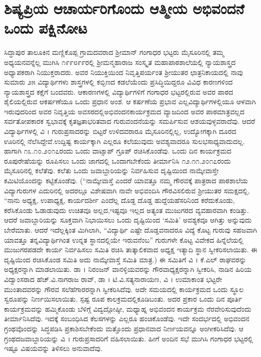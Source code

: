 {\fontsize{14}{16}\selectfont

\chapter{ಶಿಷ್ಯಪ್ರಿಯ ಆಚಾರ್ಯರಿಗೊಂದು ಆತ್ಮೀಯ ಅಭಿವಂದನೆ \eng{--} ಒಂದು ಪಕ್ಷಿನೋಟ}

ಸಿದ್ಧಾಪುರ ತಾಲೂಕಿನ ಮಣ್ಣಿಕೊಪ್ಪ ಗ್ರಾಮದವರಾದ ಶ್ರೀಮಾನ್ ಗಂಗಾಧರ ಭಟ್ಟರು ಮೈಸೂರಿನಲ್ಲಿ ತಮ್ಮ ಅಧ್ಯಯನವನ್ನೆಲ್ಲ ಮುಗಿಸಿ ೧೯೯೮\enginline{-}೯೯ರಲ್ಲಿ ಶ್ರೀಮನ್ಮಹಾರಾಜ ಸಂಸ್ಕೃತ ಮಹಾಪಾಠಶಾಲೆಯಲ್ಲಿ ನ್ಯಾಯಶಾಸ್ತ್ರದ ಅಧ್ಯಾಪಕರಾಗಿ \hbox{ನಿಯುಕ್ತರಾದರು}. ಅವರ ನಿಯುಕ್ತಿಯಿಂದ ನಿವೃತ್ತಿಪರ್ಯಂತ ಶ್ರೀಯುತರ ಛಾತ್ರನಿಕಾಯದಲ್ಲಿ ನಾವು ಸುಮಾರು ೨೫ ವಿದ್ಯಾರ್ಥಿಗಳು \enginline{-} ಶಾಸ್ತ್ರಗಳಲ್ಲಿ ಕಬ್ಬಿಣದ ಕಡಲೆಯೆಂದು ಪ್ರಸಿದ್ಧಿ\-ಯಿದ್ದರೂ ವಿವಿಧ ಕಾರಣಗಳಿಂದ ನ್ಯಾಯಶಾಸ್ತ್ರದ ಕಕ್ಷೆಗೆ ಬಂದವರು. ಆ\break ಕಾರಣಗಳಲ್ಲಿ ವಿದ್ಯಾರ್ಥಿಗಳಿಗೆ ಗಂಗಾಧರ ಭಟ್ಟರಲ್ಲಿರುವ ಅವರ ಪಾಠದ ಶೈಲಿಯಲ್ಲಿರುವ ಆಕರ್ಷಣೆಯೂ ಒಂದು ಪ್ರಧಾನ ಅಂಶ. ಆ ಕರ್ಷಣೆಯ ಪ್ರಭಾವ ಎಲ್ಲ\break ವಿದ್ಯಾರ್ಥಿಗಳಲ್ಲಿಯೂ ಆಳವಾಗಿ ಇರುವುದರಿಂದ ಅವರ ನಿವೃತ್ತಿಯ ಅವಸರದಲ್ಲಿ\break ಅಭಿವಂದನಕಾರ್ಯಕ್ರಮದ ವ್ಯಾಜದಿಂದ ಅವರ ಪಾಠಮಾತ್ರವಲ್ಲದ ಸರ್ವತೋಪ\-ಕಾರಕ ಸ್ವಭಾವಕ್ಕೆ ಕೃತಜ್ಞತಾಭರಿತವಾದ ಗುರುವಂದನೆಯನ್ನು ಸಮರ್ಪಿಸುವ ಆಶಯ\-ವುಳ್ಳವರಾದೆವು. ಆದರೆ ವಿದ್ಯಾರ್ಥಿಗಳಲ್ಲಿ ವಿ । ಗುರುಪ್ರಸಾದರನ್ನು ಬಿಟ್ಟರೆ ಉಳಿದವ\-ರಾರೂ ಮೈಸೂರಿನಲ್ಲಿಲ್ಲ, ಉದ್ಯೋಗಕ್ಕಾಗಿ ದೂರದ ಊರಿನಲ್ಲಿ ನೆಲೆಸಿದ್ದೇವೆ.\break ಉದ್ದಿಷ್ಟ ಕಾರ್ಯಕ್ಕಾಗಿ ಎಲ್ಲರೂ ಕಲೆಯುವುದು ಅವಶ್ಯವಾದರೂ ಸುಲಭಸಾಧ್ಯ\-ವಾದುದಲ್ಲ. ಹಾಗಾಗಿ ೧೩.೧೦.೨೦೧೭ರಂದು ಒಂದು ವಾಟ್ಸಾಪ್ ಗ್ರೂಪ್ ರಚಿಸಿ\-ಕೊಂಡೆವು. ಒಂದು ದಿನ ಕಾರ್ಯಕ್ರಮದ  ರೂಪುರೇಷೆಯನ್ನು ರೂಪಿಸಲು ಒಂದು ಜಾಗದಲ್ಲಿ ಒಂದಾಗಬೇಕೆಂದು ತೀರ್ಮಾನಿಸಿ ೧೨.೧೧.೨೦೧೭ರಂದು ಮೈಸೂರಿನಲ್ಲಿ ಕಲೆತೆವು. ಕಲೆತು ಒಂದು ಜವಾಬ್ದಾರಿಯನ್ನು ನಿರ್ವಹಿಸುವ ದೃಷ್ಟಿಯಿಂದ ನಾಮ್ಕೇವಾಸ್ತೇ ಕಮಿಟಿಯೊಂದನ್ನು ಕಟ್ಟಿಕೊಂಡೆವು. (“ನಾಮ್ಕೇವಾಸ್ತೆ ಎಂದರೆ \enginline{-} ಯಾವತ್ತೂ ನಮ್ಮ ಗೌರವಕ್ಕೆ ಪಾತ್ರರಾದ ಪಾಠಶಾಲೆಯ ವಿದ್ಯಾಗುರುಗಳ ಎದುರಿನಲ್ಲಿ ಅದರಲ್ಲೂ ವಿಶೇಷವಾಗಿ ನಾವೇ ಅಭಿವಂದಿಸಿ ಗೌರವಿಸಲಿರುವ ಶ್ರೀಯುತರ ಸಮಕ್ಷದಲ್ಲಿ, “ನಾನು \enginline{-} ಅಧ್ಯಕ್ಷ, ಉಪಾಧ್ಯಕ್ಷ, ಕಾರ್ಯದರ್ಶೀ ಎಂದೆಲ್ಲ ದೊಡ್ದ ದೊಡ್ಡ ಹುದ್ದೆಯ\break ಹೆಸರಿನಿಂದ ಕರೆದುಕೊಂಡು, ಕರೆಸಿಕೊಂಡು ಓಡಾಡುವುದು ಉಚಿತವೂ ಅಲ್ಲದ,\break ಇಷ್ಟವೂ ಇಲ್ಲದ ಅತ್ಯಂತ ಮುಜುಗರದ ವ್ಯವಹಾರವಾಗಿ ಕಂಡಿತ್ತು. ಆದರೆ ಜವಾಬ್ದಾರಿ\-ಯನ್ನು ಸೂಕ್ತ\-ವಾಗಿ ನಿಭಾಯಿಸಲು ಒಂದು ದೃಷ್ಟಿಯಿಂದ ‘ಸಮಿತಿ’ ಅವಶ್ಯಕವೂ ಆಗಿತ್ತು ಅನ್ನುವುದು ಬೇರೆಮಾತು. ಆದರೆ ಇದೆಲ್ಲಕ್ಕಿಂತ ಮಿಗಿಲಾಗಿ, “ವಿದ್ಯಾರ್ಥಿ ಎಷ್ಟೇ ದೊಡ್ಡವನಾದರೂ ವಿದ್ಯೆ ಕೊಟ್ಟ ಗುರುವು ಸಹಜವಾಗಿ ಯಾವತ್ತೂ ತನ್ನ\break ವಿದ್ಯಾರ್ಥಿಗಿಂತ ಉನ್ನತ ಸ್ಥಾನದಲ್ಲಿಯೇ ಇರುವನೆಂಬ” ಗುರುಗಳೇ ಕೊಟ್ಟ \hbox{ವಿವೇಕದ} ಹಿನ್ನೆಲೆಯಲ್ಲಿ ಮುಜುಗರಪಡದೇ ಕಾರ್ಯ ನಿರ್ವಹಿಸಲು ಸಮಿತಿ ರಚಿಸಿ ತಾತ್ಕಾಲಿಕ\-ವಾದ ಅಧ್ಯಕ್ಷ ಇತ್ಯಾದಿ ಸ್ಥಾನ  ಸ್ವೀಕರಿಸಲಾಯಿತು. ಈ ದೃಷ್ಟಿಯಿಂದ ರಚಿಸಿಕೊಂಡ ಸಮಿತಿ ಅದು ನಾಮ್ಕೇವಾಸ್ತೆ ಸಮಿತಿ ಮಾತ್ರ.) ಈ ಸಮಿತಿಗೆ ವಿ । ಕೆ.ಎಲ್ ರಾಘವ\-ರನ್ನು ಅಧ್ಯಕ್ಷರನ್ನಾಗಿ ಮಾಡಲಾಯಿತು. ಡಾ । ನಿರಂಜನ್ ವಾನಳ್ಳಿಯವರನ್ನು ಗೌರವಾಧ್ಯಕ್ಷರನ್ನಾಗಿ ಸ್ವೀಕರಿಸಿ, ನಾಡಿನ ಹಿರಿಯ ವಿದ್ವಾಂಸರಾದ  ಹೆಚ್.ವಿ.ನಾಗರಾಜ ರಾವ್, ಡಾ । ಟಿ.ವಿ.ಸತ್ಯನಾರಾಯಣ, ವಿ । ಉಮಾಕಾಂತ ಭಟ್ಟರೇ ಮುಂತಾದವ\-ರನ್ನು ಗೌರವ ಸಲೆಹೆಗಾರರನ್ನಾಗಿ ಸ್ವೀಕರಿಸಿದೆವು. ಅದೇ ಸಮಯದಲ್ಲಿ ಕಾರ್ಯಕ್ರಮದ ಒಂದು ಸ್ಥೂಲ ಸ್ವರೂಪನ್ನು ನಿರ್ಣಯಿಸಲಾಯಿತು. ಸ್ಪಷ್ಟ ರೂಪ ಕಾಲಕ್ರಮದಲ್ಲಿ\break ಕೂಡಿಬಂತು. ಅದರ ಪ್ರಕಾರ ಒಂದು ದಿನ ಪೂರ್ತಿ ಕಾರ್ಯಕ್ರಮವನ್ನು ಹಮ್ಮಿಕೊಂಡು ಬೆಳಿಗ್ಗೆ ವಿದ್ವದ್ಗೋಷ್ಠೀ, ಮಧ್ಯಾಹ್ನ ಅಭಿವಂದನ ಕಾರ್ಯಕ್ರಮ ನೆರವೇರಿಸುವು\-ದೆಂದು ತೀರ್ಮಾನಿಸಿದೆವು. ಇದಕ್ಕೆ ಸಂಬಂಧಿಸಿದ ಕೆಲಸಗಳನ್ನು ಎಲ್ಲರೂ ಹಂಚಿಕೊಂಡೆವು. ಇದೇ ಸಂದರ್ಭದಲ್ಲಿ ಅಭಿವಂದನ ಗ್ರಂಥವೊಂದನ್ನು ಸಿದ್ಧಪಡಿಸಿ ಪ್ರಕಾಶಿಸ\-ಬೇಕೆಂದು ಮತ್ತೊಂದು ಪ್ರಧಾನವಾದ ನಿರ್ಣಯವನ್ನೂ ಅಂಗೀಕರಿಸಿದೆವು. ಆ ಗ್ರಂಥದ\break ಜವಾಬ್ದಾರಿಯನ್ನು ವಿ । ಗುರುಪ್ರಸಾದರಿಗೆ ವಹಿಸಲಾಯಿತು. ಹೀಗೆ ಅಂದಿನ ಸಭೆ ಮುಗಿಸಿ ಗಂಗಾಧರ ಭಟ್ಟರಲ್ಲಿ ಇಷ್ಟೂ ವಿಷಯವನ್ನು ತಿಳಿಸಲು ಅನುವಾದೆವು.

}
